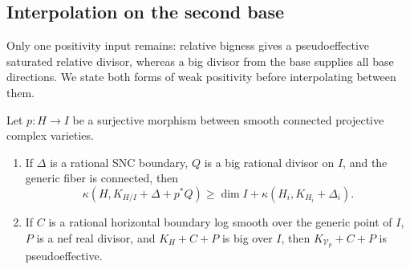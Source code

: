 \subsection{Interpolation on the second base}

Only one positivity input remains: relative bigness gives a
pseudoeffective saturated relative divisor, whereas a big divisor
from the base supplies all base directions. We state both forms of
weak positivity before interpolating between them.

\begin{lemma}\label{num:weak}
Let $p:H\to I$ be a surjective morphism between smooth connected
projective complex varieties.
\begin{enumerate}[label=\textup{(\roman*)}]
\item If $\Delta$ is a rational SNC boundary, $Q$ is a big rational divisor
on $I$, and the generic fiber is connected, then
\[
 \kappa(H,K_{H/I}+\Delta+p^*Q)
 \geq\dim I+\kappa(H_i,K_{H_i}+\Delta_i).
\]
\item If $C$ is a rational horizontal boundary log smooth over the generic
point of $I$, $P$ is a nef real divisor, and $K_H+C+P$ is big over $I$, then
$K_{\mathcal V_p}+C+P$ is pseudoeffective.
\end{enumerate}
\end{lemma}


